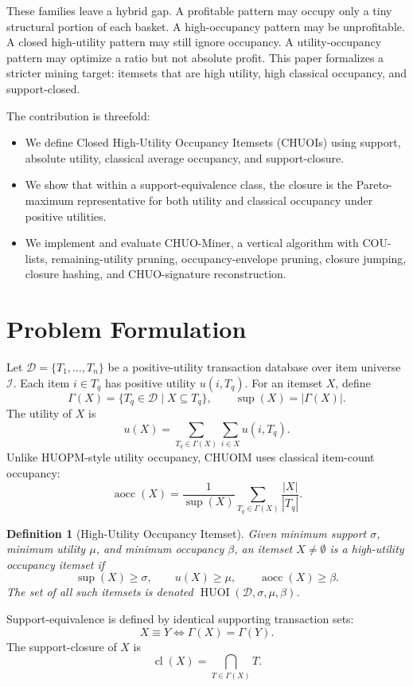 \documentclass[11pt,a4paper]{article}
\newtheorem{definition}{Definition}
\newcommand{\D}{\mathcal{D}}
\newcommand{\I}{\mathcal{I}}
\newcommand{\GammaSet}{\Gamma}
\newcommand{\supp}{\operatorname{sup}}
\newcommand{\cl}{\operatorname{cl}}
\newcommand{\aocc}{\operatorname{aocc}}
\newcommand{\HUOI}{\operatorname{HUOI}}
\begin{document}
These families leave a hybrid gap. A profitable pattern may occupy only a tiny structural portion of each basket. A high-occupancy pattern may be unprofitable. A closed high-utility pattern may still ignore occupancy. A utility-occupancy pattern may optimize a ratio but not absolute profit. This paper formalizes a stricter mining target: itemsets that are high utility, high classical occupancy, and support-closed.

The contribution is threefold:
\begin{itemize}
    \item We define Closed High-Utility Occupancy Itemsets (CHUOIs) using support, absolute utility, classical average occupancy, and support-closure.
    \item We show that within a support-equivalence class, the closure is the Pareto-maximum representative for both utility and classical occupancy under positive utilities.
    \item We implement and evaluate CHUO-Miner, a vertical algorithm with COU-lists, remaining-utility pruning, occupancy-envelope pruning, closure jumping, closure hashing, and CHUO-signature reconstruction.
\end{itemize}

\section{Problem Formulation}

Let \(\D=\{T_1,\ldots,T_n\}\) be a positive-utility transaction database over item universe \(\I\). Each item \(i\in T_q\) has positive utility \(u(i,T_q)\). For an itemset \(X\), define
\[
\GammaSet(X)=\{T_q\in \D\mid X\subseteq T_q\},
\qquad
\supp(X)=|\GammaSet(X)|.
\]
The utility of \(X\) is
\[
u(X)=\sum_{T_q\in\GammaSet(X)}\sum_{i\in X}u(i,T_q).
\]
Unlike HUOPM-style utility occupancy, CHUOIM uses classical item-count occupancy:
\[
\aocc(X)=
\frac{1}{\supp(X)}
\sum_{T_q\in\GammaSet(X)}
\frac{|X|}{|T_q|}.
\]

\begin{definition}[High-Utility Occupancy Itemset]
Given minimum support \(\sigma\), minimum utility \(\mu\), and minimum occupancy \(\beta\), an itemset \(X\neq\emptyset\) is a high-utility occupancy itemset if
\[
\supp(X)\ge\sigma,\qquad u(X)\ge\mu,\qquad \aocc(X)\ge\beta.
\]
The set of all such itemsets is denoted \(\HUOI(\D,\sigma,\mu,\beta)\).
\end{definition}

Support-equivalence is defined by identical supporting transaction sets:
\[
X\equiv Y \iff \GammaSet(X)=\GammaSet(Y).
\]
The support-closure of \(X\) is
\[
\cl(X)=\bigcap_{T\in\GammaSet(X)}T.
\]
\end{document}
